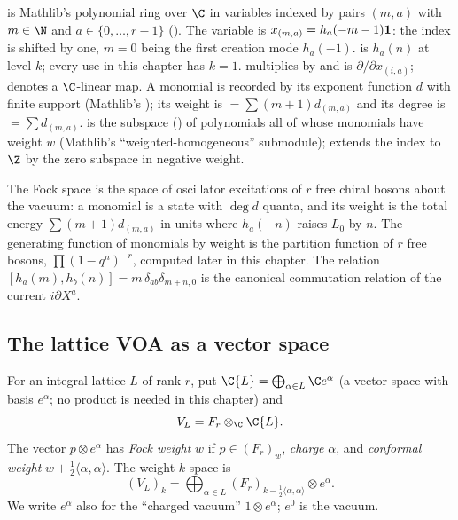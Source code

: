 \begin{dictionary}
 is Mathlib's polynomial ring over $\C$ in variables indexed by
pairs $(m,a)$ with $m\in\N$ and $a\in\{0,\dots,r-1\}$ (). The variable
 is $x_{(m,a)}=h_a(-m-1)\mathbf{1}$: the index is shifted by one, $m=0$ being the
first creation mode $h_a(-1)$.  is $h_a(n)$ at level $k$; every use in this
chapter has $k=1$.  multiplies by  and  is
$\partial/\partial x_{(i,a)}$;  denotes a $\C$-linear map. A monomial is recorded by its
exponent function $d$ with finite support (Mathlib's ); its weight is
 $=\sum(m+1)d_{(m,a)}$ and its degree is 
$=\sum d_{(m,a)}$.  is the subspace () of polynomials all of whose
monomials have weight $w$ (Mathlib's ``weighted-homogeneous'' submodule);  extends
the index to $\Z$ by the zero subspace  in negative weight.
\end{dictionary}

\begin{physics}
The Fock space is the space of oscillator excitations of $r$ free chiral bosons about the vacuum: a monomial is a state with $\deg d$ quanta, and its weight is the total energy $\sum(m+1)d_{(m,a)}$ in units where $h_a(-n)$ raises $L_0$ by $n$. The generating function of monomials by weight is the partition function of $r$ free bosons, $\prod(1-q^n)^{-r}$, computed later in this chapter. The relation $[h_a(m),h_b(n)]=m\,\delta_{ab}\delta_{m+n,0}$ is the canonical commutation relation of the current $i\partial X^a$.
\end{physics}

\subsection{The lattice VOA as a vector space}

\begin{definition}\label{ch04:def:VL}
For an integral lattice $L$ of rank $r$, put $\C\{L\}=\bigoplus_{\alpha\in L}\C e^\alpha$ (a vector
space with basis $e^\alpha$; no product is needed in this chapter) and
\begin{equation*}
  V_L = F_r\otimes_{\C} \C\{L\}.
\end{equation*}
The vector $p\otimes e^\alpha$ has \emph{Fock weight} $w$ if $p\in(F_r)_w$, \emph{charge} $\alpha$,
and \emph{conformal weight} $w+\tfrac12\langle\alpha,\alpha\rangle$. The weight-$k$ space is
\begin{equation*}
  (V_L)_k=\bigoplus_{\alpha\in L}(F_r)_{k-\frac12\langle\alpha,\alpha\rangle}\otimes e^\alpha .
\end{equation*}
We write $e^\alpha$ also for the ``charged vacuum'' $1\otimes e^\alpha$; $e^0$ is the vacuum.
\end{definition}

